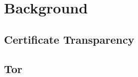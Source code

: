 \section{Background} \label{sec:background}

\subsection{Certificate Transparency} \label{sec:background:ct}

\subsection{Tor} \label{sec:background:tor}

